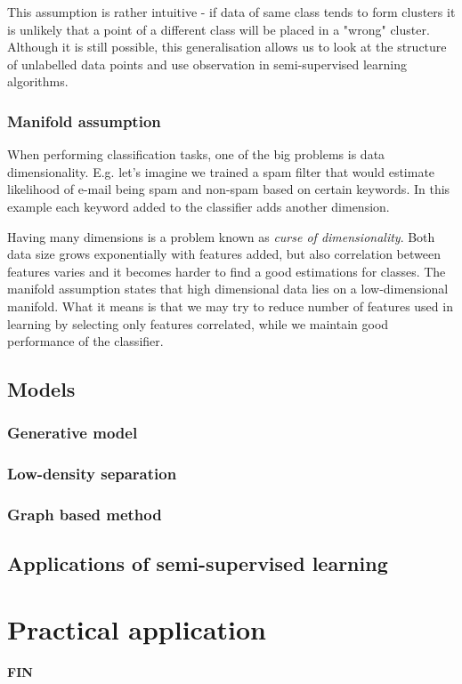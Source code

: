 \documentclass[12pt, a4paper, pdflatex]{report}
\begin{document}
This assumption is rather intuitive -  if data of same class tends to form clusters it is unlikely that a point of a different class will be placed in a "wrong" cluster. Although it is still possible, this generalisation allows us to look at the structure of unlabelled data points and use observation in semi-supervised learning algorithms.

\subsection{Manifold assumption}
 
When performing classification tasks, one of the big problems is data dimensionality. E.g. let's imagine we trained a spam filter that would estimate likelihood of e-mail being spam and non-spam based on certain keywords. In this example each keyword added to the classifier adds another dimension. 

Having many dimensions is a problem known as \textit{curse of dimensionality}\cite{chapelle06}. Both data size grows exponentially with features added, but also correlation between features varies and it becomes harder to find a good estimations for classes. The manifold assumption states that high dimensional data lies on a low-dimensional manifold. What it means is that we may try to reduce number of features used in learning by selecting only features correlated, while we maintain good performance of the classifier. 

 
\section{Models}
\subsection{Generative model}
\subsection{Low-density separation}
\subsection{Graph based method}

\section{Applications of semi-supervised learning}
\chapter{Practical application}


{}

\newpage
\begin{center} \textbf{\huge \vspace{15pt} FIN} \end{center}


\end{document}
